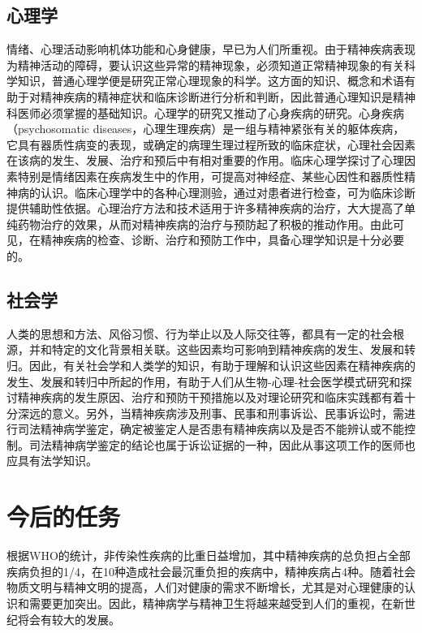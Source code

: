 \subsection{心理学}

情绪、心理活动影响机体功能和心身健康，早已为人们所重视。由于精神疾病表现为精神活动的障碍，要认识这些异常的精神现象，必须知道正常精神现象的有关科学知识，普通心理学便是研究正常心理现象的科学。这方面的知识、概念和术语有助于对精神疾病的精神症状和临床诊断进行分析和判断，因此普通心理知识是精神科医师必须掌握的基础知识。心理学的研究又推动了心身疾病的研究。心身疾病（psychosomatic
diseases，心理生理疾病）是一组与精神紧张有关的躯体疾病，它具有器质性病变的表现，或确定的病理生理过程所致的临床症状，心理社会因素在该病的发生、发展、治疗和预后中有相对重要的作用。临床心理学探讨了心理因素特别是情绪因素在疾病发生中的作用，可提高对神经症、某些心因性和器质性精神病的认识。临床心理学中的各种心理测验，通过对患者进行检查，可为临床诊断提供辅助性依据。心理治疗方法和技术适用于许多精神疾病的治疗，大大提高了单纯药物治疗的效果，从而对精神疾病的治疗与预防起了积极的推动作用。由此可见，在精神疾病的检查、诊断、治疗和预防工作中，具备心理学知识是十分必要的。

\subsection{社会学}

人类的思想和方法、风俗习惯、行为举止以及人际交往等，都具有一定的社会根源，并和特定的文化背景相关联。这些因素均可影响到精神疾病的发生、发展和转归。因此，有关社会学和人类学的知识，有助于理解和认识这些因素在精神疾病的发生、发展和转归中所起的作用，有助于人们从生物-心理-社会医学模式研究和探讨精神疾病的发生原因、治疗和预防干预措施以及对理论研究和临床实践都有着十分深远的意义。另外，当精神疾病涉及刑事、民事和刑事诉讼、民事诉讼时，需进行司法精神病学鉴定，确定被鉴定人是否患有精神疾病以及是否不能辨认或不能控制。司法精神病学鉴定的结论也属于诉讼证据的一种，因此从事这项工作的医师也应具有法学知识。

\section{今后的任务}

根据WHO的统计，非传染性疾病的比重日益增加，其中精神疾病的总负担占全部疾病负担的1/4，在10种造成社会最沉重负担的疾病中，精神疾病占4种。随着社会物质文明与精神文明的提高，人们对健康的需求不断增长，尤其是对心理健康的认识和需要更加突出。因此，精神病学与精神卫生将越来越受到人们的重视，在新世纪将会有较大的发展。


